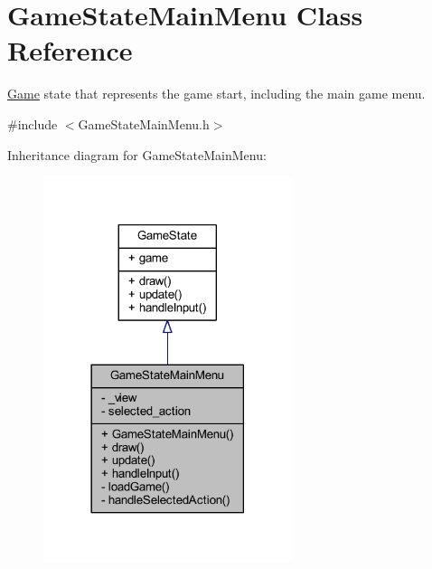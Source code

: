 \hypertarget{class_game_state_main_menu}{\section{Game\+State\+Main\+Menu Class Reference}
\label{class_game_state_main_menu}
}


\hyperlink{class_game}{Game} state that represents the game start, including the main game menu.  




{\ttfamily \#include $<$Game\+State\+Main\+Menu.\+h$>$}



Inheritance diagram for Game\+State\+Main\+Menu\+:
\nopagebreak
\begin{figure}[H]
\begin{center}
\leavevmode
\includegraphics[width=206pt]{class_game_state_main_menu__inherit__graph}
\end{center}
\end{figure}


